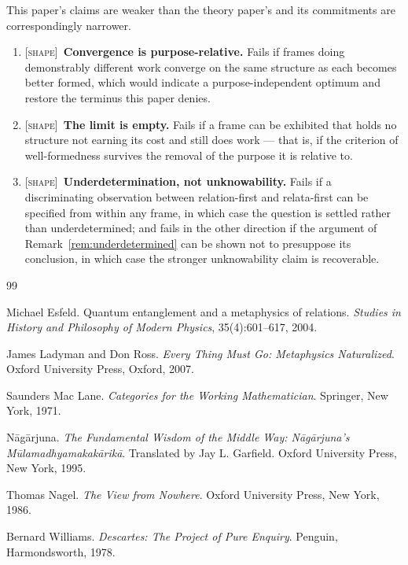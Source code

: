 \documentclass[11pt,a4paper]{article}
\theoremstyle{remark}\newtheorem{remark}[definition]{Remark}
\begin{document}
This paper's claims are weaker than the theory paper's and its commitments are correspondingly
narrower.

\begin{enumerate}[leftmargin=*]
\item \textsc{[shape]}~\textbf{Convergence is purpose-relative.} Fails if frames doing demonstrably different work
converge on the same structure as each becomes better formed, which would indicate a
purpose-independent optimum and restore the terminus this paper denies.
\item \textsc{[shape]}~\textbf{The limit is empty.} Fails if a frame can be exhibited that holds no structure not
earning its cost and still does work --- that is, if the criterion of well-formedness survives the
removal of the purpose it is relative to.
\item \textsc{[shape]}~\textbf{Underdetermination, not unknowability.} Fails if a discriminating observation between
relation-first and relata-first can be specified from within any frame, in which case the question is
settled rather than underdetermined; and fails in the other direction if the argument of
Remark~\ref{rem:underdetermined} can be shown not to presuppose its conclusion, in which case the
stronger unknowability claim is recoverable.
\end{enumerate}

\begin{thebibliography}{99}

Michael Esfeld.
\newblock Quantum entanglement and a metaphysics of relations.
\newblock \emph{Studies in History and Philosophy of Modern Physics}, 35(4):601--617, 2004.

James Ladyman and Don Ross.
\newblock \emph{Every Thing Must Go: Metaphysics Naturalized}.
\newblock Oxford University Press, Oxford, 2007.

Saunders Mac Lane.
\newblock \emph{Categories for the Working Mathematician}.
\newblock Springer, New York, 1971.

N\=ag\=arjuna.
\newblock \emph{The Fundamental Wisdom of the Middle Way: N\=ag\=arjuna's M\=ulamadhyamakak\=arik\=a}.
\newblock Translated by Jay L. Garfield. Oxford University Press, New York, 1995.

Thomas Nagel.
\newblock \emph{The View from Nowhere}.
\newblock Oxford University Press, New York, 1986.

Bernard Williams.
\newblock \emph{Descartes: The Project of Pure Enquiry}.
\newblock Penguin, Harmondsworth, 1978.

\end{thebibliography}
\end{document}
